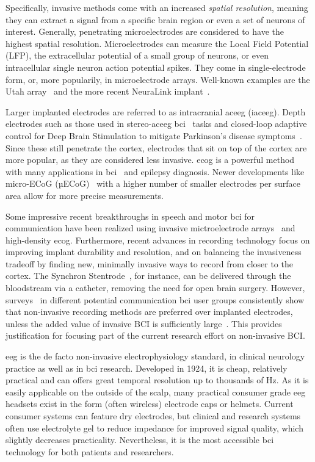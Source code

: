 Specifically, invasive methods come with an increased \emph{spatial resolution},
meaning they can extract a signal from a specific brain region or even a set of
neurons of interest.
Generally, penetrating microelectrodes are considered to have the highest
spatial resolution.
Microelectrodes can measure the Local Field Potential (LFP), the extracellular
potential of a small group of neurons, or even intracellular single neuron
action potential spikes.
They come in single-electrode form, or, more popularily, in microelectrode
arrays.
Well-known examples are the Utah array~\cite{Maynard1997} and the more recent
NeuraLink implant~\cite{Musk2019}.

Larger implanted electrodes are referred to as intracranial ac{eeg} (iac{eeg}).
Depth electrodes such as those used in stereo-ac{eeg} \ac{bci}~\cite{Wu2024} tasks
and closed-loop adaptive control for Deep Brain Stimulation to mitigate
Parkinson's disease symptoms~\cite{Arlotti2018}.
Since these still penetrate the cortex, electrodes that sit on top of the
cortex are more popular, as they are considered less invasive.
\ac{ecog} is a powerful method
with many applications in \ac{bci}~\cite{Schalk2011} and epilepsy diagnosis.
Newer developments like micro-ECoG (µECoG)~\cite{Shokoueinejad2019} with a
higher number of smaller electrodes per surface area allow for more precise
measurements.

Some impressive recent breakthroughs in speech and motor \ac{bci} for communication
 have been realized using
invasive mictroelectrode arrays~\cite{Willett2021} and high-density
\Ac{ecog}\cite{Metzger2023}.
Furthermore, recent advances in recording technology focus on improving implant
durability and resolution, and on balancing the invasiveness
tradeoff by finding new, minimally invasive ways to record from closer to the cortex.
The Synchron Stentrode~\cite{Mitchell2023}, for instance, can be delivered
through the bloodstream via a catheter, removing the need for open brain
surgery.
However, surveys~\cite{Huggins2011, Huggins2015, Branco2021} in different
potential communication \ac{bci} user groups consistently show that non-invasive
recording methods are preferred over implanted electrodes, unless the added value of invasive BCI is
sufficiently large~\cite{Kageyama2020}.
This provides justification for focusing part of the current research effort on
non-invasive BCI.

\Ac{eeg} is the de facto non-invasive electrophysiology standard, in clinical
neurology practice as well as in \ac{bci} research.
Developed in 1924, it is cheap, relatively practical and can offers great
temporal resolution up to thousands of Hz.
As it is easily applicable on the outside of the scalp, many practical
consumer grade \ac{eeg} headsets exist in the form (often wireless) electrode
caps or helmets.
Current consumer systems can feature dry electrodes, but clinical and
research systems often use electrolyte gel to reduce impedance for improved signal
quality, which slightly decreases practicality.
Nevertheless, it is the most accessible \ac{bci} technology for both patients
and researchers.

